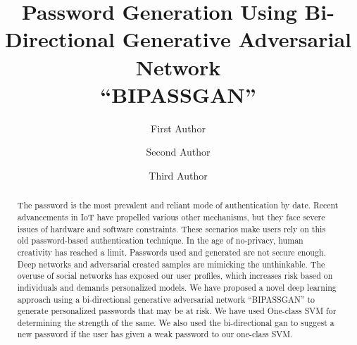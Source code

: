 \documentclass[runningheads]{llncs}
\newcommand{\quotes}[1]{``#1''}
\begin{document}
%
\title{Password Generation Using Bi-Directional Generative Adversarial Network\\ \quotes{BIPASSGAN}}
%
%
\author{First Author \and
Second Author \and
Third Author}
%
%
%
\maketitle              %
%

\begin{abstract}
The password is the most prevalent and reliant mode of authentication by date. Recent advancements in IoT have propelled various other mechanisms, but they face severe issues of hardware and software constraints. These scenarios make users rely on this old password-based authentication technique. In the age of no-privacy, human creativity has reached a limit. Passwords used and generated are not secure enough. Deep networks and adversarial created samples are mimicking the unthinkable. The overuse of social networks has exposed our user profiles, which increases risk based on individuals and demands personalized models. We have proposed a novel deep learning approach using a bi-directional generative adversarial network  \quotes{BIPASSGAN} to generate personalized passwords that may be at risk. We have used One-class SVM for determining the strength of the same. We also used the bi-directional gan to suggest a new password if the user has given a weak password to our one-class SVM. 

\end{abstract}
\end{document}

